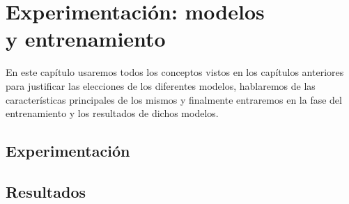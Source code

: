 \chapter{Experimentación: modelos \\ y entrenamiento}

En este capítulo usaremos todos los conceptos vistos en los capítulos anteriores para justificar las elecciones de los diferentes modelos, hablaremos de las características principales de los mismos y finalmente entraremos en la fase del entrenamiento y los resultados de dichos modelos.







\section{Experimentación}


\section{Resultados}